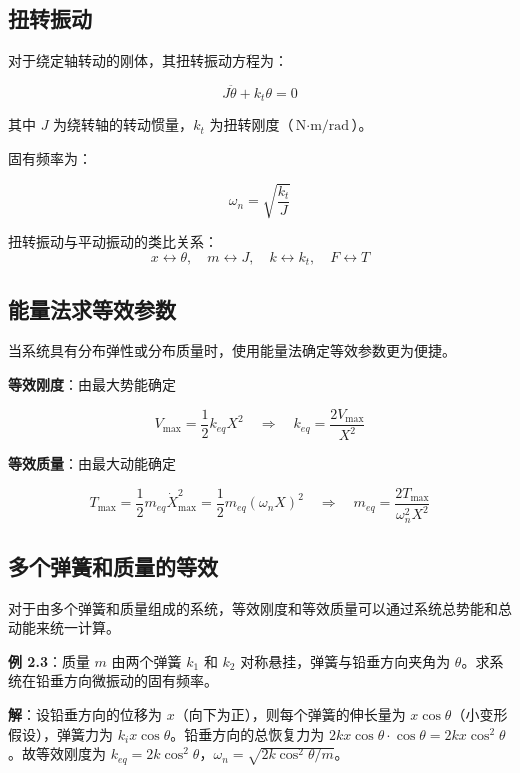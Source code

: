 \subsection{扭转振动}

对于绕定轴转动的刚体，其扭转振动方程为：
\begin{myformula}
    \[
    J\ddot{\theta} + k_t\theta = 0
    \]
\end{myformula}
其中 $J$ 为绕转轴的转动惯量，$k_t$ 为扭转刚度（$\text{N}\cdot\text{m/rad}$）。

固有频率为：
\begin{myformula}
    \[
    \omega_n = \sqrt{\frac{k_t}{J}}
    \]
\end{myformula}

扭转振动与平动振动的类比关系：
\[
x \leftrightarrow \theta,\quad m \leftrightarrow J,\quad k \leftrightarrow k_t,\quad F \leftrightarrow T
\]

\subsection{能量法求等效参数}

当系统具有分布弹性或分布质量时，使用能量法确定等效参数更为便捷。

\textbf{等效刚度}：由最大势能确定
\begin{myformula}
    \[
    V_{\max} = \frac{1}{2}k_{eq}X^2 \quad\Rightarrow\quad k_{eq} = \frac{2V_{\max}}{X^2}
    \]
\end{myformula}

\textbf{等效质量}：由最大动能确定
\begin{myformula}
    \[
    T_{\max} = \frac{1}{2}m_{eq}\dot{X}_{\max}^2 = \frac{1}{2}m_{eq}(\omega_n X)^2 \quad\Rightarrow\quad m_{eq} = \frac{2T_{\max}}{\omega_n^2 X^2}
    \]
\end{myformula}

\subsection{多个弹簧和质量的等效}

对于由多个弹簧和质量组成的系统，等效刚度和等效质量可以通过系统总势能和总动能来统一计算。

\textbf{例 2.3}：质量 $m$ 由两个弹簧 $k_1$ 和 $k_2$ 对称悬挂，弹簧与铅垂方向夹角为 $\theta$。求系统在铅垂方向微振动的固有频率。

\textbf{解}：设铅垂方向的位移为 $x$（向下为正），则每个弹簧的伸长量为 $x\cos\theta$（小变形假设），弹簧力为 $k_i x\cos\theta$。铅垂方向的总恢复力为 $2kx\cos\theta\cdot\cos\theta = 2kx\cos^2\theta$。故等效刚度为 $k_{eq} = 2k\cos^2\theta$，$\omega_n = \sqrt{2k\cos^2\theta/m}$。

